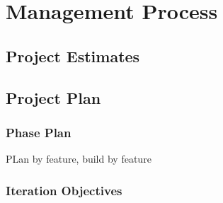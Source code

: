 
\chapter{Management Process} %

\label{Part6Chapter4} %



\section{Project Estimates}




\section{Project Plan}


\subsection{Phase Plan}

PLan by feature, build by feature


\subsection{Iteration Objectives}

